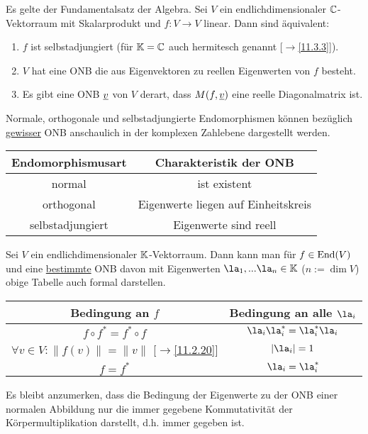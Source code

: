 \documentclass[../../main.tex]{subfiles}
\begin{document}
\begin{sat}\label{15.2.7}
Es gelte der Fundamentalsatz der Algebra. Sei $V$ ein endlichdimensionaler $\mathbb C$-Vektorraum mit Skalarprodukt und $f: V\to V$ linear. Dann sind äquivalent:
\begin{enumerate}[\normalfont(a)]
\item $f$ ist selbstadjungiert (für $\mathbb K=\mathbb C$ auch hermitesch genannt [$\to$\ref{11.3.3}]).
\item $V$ hat eine ONB die aus Eigenvektoren zu reellen Eigenwerten von $f$ besteht.
\item Es gibt eine ONB ${\underline v}$ von $V$ derart, dass $M(f,{\underline v})$ eine reelle Diagonalmatrix ist.
\end{enumerate}
\end{sat}

\begin{ans}
Normale, orthogonale und selbstadjungierte Endomorphismen können bezüglich \underline{gewisser} ONB anschaulich in der komplexen Zahlebene dargestellt werden.
\begin{center}
\begin{tabular}{c|c}
\textbf{Endomorphismusart} & \textbf{Charakteristik der ONB}\\
\hline
normal & ist existent\\
orthogonal & Eigenwerte liegen auf Einheitskreis\\
selbstadjungiert & Eigenwerte sind reell
\end{tabular}
\end{center}
Sei $V$ ein endlichdimensionaler $\mathbb K$-Vektorraum. Dann kann man für $f\in\operatorname{End}(V)$ und eine \underline{bestimmte} ONB davon mit Eigenwerten $\la_1,...\la_n\in \K$ ($n:=\dim V$) obige Tabelle auch formal darstellen.
\begin{center}
\begin{tabular}{c|c}
\textbf{Bedingung an $f$} & \textbf{Bedingung an alle $\la_i$}\\
\hline
$f\circ f^*=f^*\circ f$ & $\la_i\la_i^*=\la_i^*\la_i$\\
$\forall v\in V: \| f(v)\|=\|v\|$ [$\to$\ref{11.2.20}] & $\vert \la_i\vert=1$\\
$f=f^*$ & $\la_i=\la_i^*$
\end{tabular}
\end{center}
Es bleibt anzumerken, dass die Bedingung der Eigenwerte zu der ONB einer normalen Abbildung nur die immer gegebene Kommutativität der Körpermultiplikation darstellt, d.h. immer gegeben ist.
\end{ans}
\end{document}
